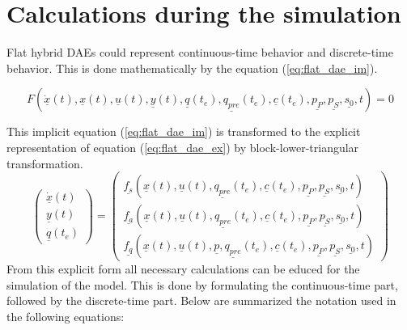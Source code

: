 

\appendix
\section{Calculations during the simulation}\label{app:calculations}

Flat hybrid DAEs could represent continuous-time behavior and
discrete-time behavior. This is done mathematically by the equation
(\ref{eq:flat_dae_im}).

\begin{equation}\label{eq:flat_dae_im}
	F(	\underline{\dot x}(t),
	\underline{x}(t),
	\underline{u}(t),
	\underline{y}(t),
	\underline{q}(t_e),
	\underline{q_{pre}}(t_e),
	\underline{c}(t_e),
	\underline{p_{P}},
	\underline{p_{S}},
	\underline{s_0},
	t) = 0
\end{equation}

This implicit equation (\ref{eq:flat_dae_im}) is transformed to the explicit
representation of equation (\ref{eq:flat_dae_ex}) by block-lower-triangular
transformation.
\begin{equation}\label{eq:flat_dae_ex}
		 \left(  \begin{array}{c}
		     \underline{\dot x}(t) \\
		     \underline{y}(t) \\
		     \underline{q}(t_e)
		   \end{array} \right) =
			\left( \begin{array}{c}
			\underline{f_s}(\underline{x}(t),
			 	\underline{u}(t),
			 	\underline{q_{pre}}(t_e),
			 	\underline{c}(t_e),
		 		\underline{p_{P}},
				\underline{p_{S}},
				\underline{s_0},
			 	t) \\
			\underline{f_a}(\underline{x}(t),
			 	\underline{u}(t),
			 	\underline{q_{pre}}(t_e),
			 	\underline{c}(t_e),
			 	\underline{p_{P}},
				\underline{p_{S}},
				\underline{s_0},
			 	t) \\
			\underline{f_q}(\underline{x}(t),
			 	\underline{u}(t),
			 	\underline{p},
			 	\underline{q_{pre}}(t_e),
			 	\underline{c}(t_e),
			 	\underline{p_{P}},
				\underline{p_{S}},
				\underline{s_0},
			 	t)
			\end{array} \right)
\end{equation}
From this explicit form all necessary calculations can be educed for the
simulation of the model. This is done by formulating the
continuous-time part, followed by the discrete-time part. Below are
summarized the notation used in the following equations:


